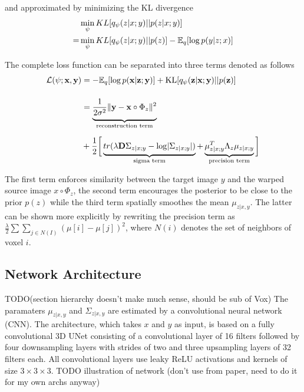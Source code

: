 and approximated by minimizing the KL divergence
\begin{equation}
	\begin{split}
		  &\min_\psi KL [ q_\psi(z | x; y) || p(z | x; y) ] \\
		= &\min_\psi KL [ q_\psi(z | x; y) || p(z) ] - \mathbb{E}_q [ \log p(y | z; x) ]
	\end{split}
\end{equation}

The complete loss function can be separated into three terms denoted as follows
\begin{equation} \label{eq:voxloss}
	\begin{split}
		\mathcal{L}(\psi; \mathbf{x}, \mathbf{y})
		& = -\E_{q}[ \log p( \mathbf{x} | \mathbf{z}; \mathbf{y} ) ]
		+ \text{KL} [ q_{\psi} ( \mathbf{z} | \mathbf{x} ; \mathbf{y} ) || p ( \mathbf{z} ) ] \\[12pt]
		& = \underbrace{
			\frac{1}{2 \sigma^2} \norm{\mathbf{y} - \mathbf{x} \circ \Phi_{z}}^{2} \vphantom{\frac{1}{2_{2_2}}}
		}_{\text{reconstruction term}} \\[6pt]
		& + \frac{1}{2} \bigg[
		\underbrace{
			tr( \lambda \mathbf{D} \Sigma_{z | x; y} - \log \abs{ \Sigma_{z | x; y} } ) \vphantom{\mu_{z | x; y}^{T}}
		}_{\text{sigma term}} +
		\underbrace{
			\mu_{z | x; y}^{T} \Lambda_{z} \mu_{z | x; y}
		}_{\text{precision term}} \bigg]
	\end{split}
\end{equation}

The first term enforces similarity between the target image $y$ and the warped source image $x \circ \Phi_z$, the second term encourages the posterior to be close to the prior $p(z)$ while the third term spatially smoothes the mean $\mu_{z | x, y}$. The latter can be shown more explicitly by rewriting the precision term as $ { \frac{\lambda}{2} \sum \sum_{j \in N(I)} ( \mu[i] - \mu[j])^{2} } $, where $N(i)$ denotes the set of neighbors of voxel $i$.

\subsection{Network Architecture}
TODO(section hierarchy doesn't make much sense, should be sub of Vox)
The paramaters $\mu_{z | x, y}$ and $\Sigma_{z | x, y}$ are estimated by a convolutional neural network (CNN). The architecture, which takes $x$ and $y$ as input, is based on a fully convolutional 3D UNet consisting of a convolutional layer of 16 filters followed by four downsampling layers with strides of two and three upsampling layers of 32 filters each. All convolutional layers use leaky ReLU activations and kernels of size $3\times3\times3$. TODO illustration of network (don't use from paper, need to do it for my own archs anyway)

